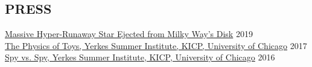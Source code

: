 \documentclass[margin]{res}
\begin{document}
\begin{resume}
\section{PRESS}

\href{https://news.umich.edu/u-m-researchers-confirm-massive-hyper-runaway-star-ejected-from-the-milky-way-disk/}{Massive Hyper-Runaway Star Ejected from Milky Way's Disk} \hfill 2019\\
\href{http://kicp.uchicago.edu/events/kicp_yerkes.html#id_959}{The Physics of Toys, Yerkes Summer Institute, KICP, University of Chicago} \hfill 2017\\
\href{http://kicp.uchicago.edu/events/kicp_yerkes.html#id_785}{Spy vs. Spy, Yerkes Summer Institute, KICP, University of Chicago} \hfill 2016\\















\end{resume}
\end{document}
